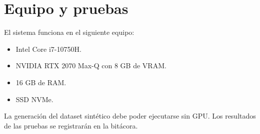 \section{Equipo y pruebas}

El sistema funciona en el siguiente equipo:

\begin{itemize}
\item Intel Core i7-10750H.
\item NVIDIA RTX 2070 Max-Q con 8 GB de VRAM.
\item 16 GB de RAM.
\item SSD NVMe.
\end{itemize}

La generación del dataset sintético debe poder ejecutarse sin GPU.
Los resultados de las pruebas se registrarán en la bitácora.
